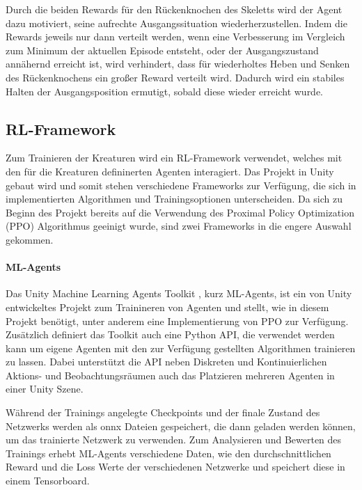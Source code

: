 Durch die beiden Rewards für den Rückenknochen des Skeletts wird der Agent dazu motiviert, seine aufrechte Ausgangssituation wiederherzustellen. Indem die Rewards jeweils nur dann verteilt werden, wenn eine Verbesserung im Vergleich zum Minimum der aktuellen Episode entsteht, oder der Ausgangszustand annähernd erreicht ist, wird verhindert, dass für wiederholtes Heben und Senken des Rückenknochens ein großer Reward verteilt wird. Dadurch wird ein stabiles Halten der Ausgangsposition ermutigt, sobald diese wieder erreicht wurde.

\subsection{RL-Framework}
Zum Trainieren der Kreaturen wird ein RL-Framework verwendet, welches mit den für die Kreaturen defininerten Agenten interagiert. Das Projekt in Unity gebaut wird und somit stehen verschiedene Frameworks zur Verfügung, die sich in implementierten Algorithmen und Trainingsoptionen unterscheiden. Da sich zu Beginn des Projekt bereits auf die Verwendung des Proximal Policy Optimization (PPO) Algorithmus geeinigt wurde, sind zwei Frameworks in die engere Auswahl gekommen.

\paragraph{ML-Agents} \label{mlAgentsFramework}
\noindent Das Unity Machine Learning Agents Toolkit \cite{juliani2020}, kurz ML-Agents, ist ein von Unity entwickeltes Projekt zum Trainineren von Agenten und stellt, wie in diesem Projekt benötigt, unter anderem eine Implementierung von PPO zur Verfügung.
Zusätzlich definiert das Toolkit auch eine Python API, die verwendet werden kann um eigene Agenten mit den zur Verfügung gestellten Algorithmen trainieren zu lassen.
Dabei unterstützt die API neben Diskreten und Kontinuierlichen Aktions- und Beobachtungsräumen auch das Platzieren mehreren Agenten in einer Unity Szene.

Während der Trainings angelegte Checkpoints und der finale Zustand des Netzwerks werden als onnx Dateien gespeichert, die dann geladen werden können, um das trainierte Netzwerk zu verwenden.
Zum Analysieren und Bewerten des Trainings erhebt ML-Agents verschiedene Daten, wie den durchschnittlichen Reward und die Loss Werte der verschiedenen Netzwerke und speichert diese in einem Tensorboard. 

